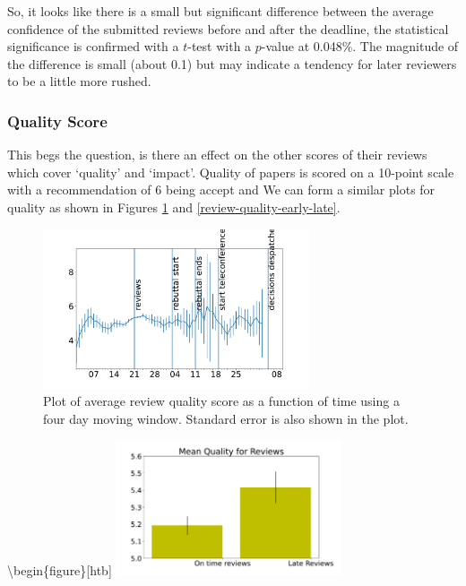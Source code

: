 So, it looks like there is a small but significant difference between
the average confidence of the submitted reviews before and after the
deadline, the statistical significance is confirmed with a \(t\)-test
with a \(p\)-value at 0.048\%. The magnitude of the difference is small
(about 0.1) but may indicate a tendency for later reviewers to be a
little more rushed.

\hypertarget{quality-score}{%
\subsubsection{Quality Score}\label{quality-score}}

This begs the question, is there an effect on the other scores of their
reviews which cover `quality' and `impact'. Quality of papers is scored
on a 10-point scale with a recommendation of 6 being accept and We can
form a similar plots for quality as shown in Figures
\ref{review-quality-time} and \ref{review-quality-early-late}.

\begin{figure}[htb]
\includegraphics[width=0.70\textwidth]{diagrams/neurips/review-quality-time.pdf}


\caption{Plot of average review quality score as a function of time using a four day moving window. Standard error is also shown in the plot.}
\label{review-quality-time}
\end{figure}

\textbackslash begin\{figure\}{[}htb{]}
\includegraphics[width=0.50\textwidth]{diagrams/neurips/review-quality-early-late.pdf}


